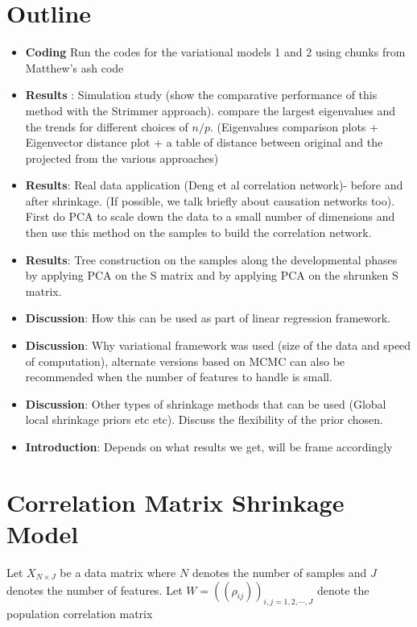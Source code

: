 \documentclass[12pt]{article}
\begin{document}
\section{Outline}

\begin{itemize}

\item \textbf{Coding} Run the codes for the variational models 1 and 2 using chunks from Matthew's ash code 
\item \textbf{Results} : Simulation study (show the comparative performance of this method with the Strimmer approach). compare the largest eigenvalues and the trends for different choices of $n/p$. (Eigenvalues comparison plots + Eigenvector distance plot + a table of distance between original and the projected from the various approaches)
\item \textbf{Results}: Real data application (Deng et al correlation network)- before and after shrinkage. (If possible, we talk briefly about causation networks too). First do PCA to scale down the data to a small number of dimensions and then use this method on the samples to build the correlation network.
\item \textbf{Results}: Tree construction on the samples along the developmental phases by applying PCA on the S matrix and by applying PCA on the shrunken S matrix. 
\item \textbf{Discussion}: How this can be used as part of linear regression framework.  
\item \textbf{Discussion}: Why variational framework was used (size of the data and speed of computation), alternate versions based on MCMC can also be recommended when the number of features to handle is small.
\item \textbf{Discussion}: Other types of shrinkage methods that can be used (Global local shrinkage priors etc etc). Discuss the flexibility of the prior chosen.
\item \textbf{Introduction}: Depends on what results we get, will be frame accordingly 

\end{itemize}



\section{Correlation Matrix Shrinkage Model}

Let $X_{N \times J}$ be a data matrix where $N$ denotes the number of samples and $J$ denotes the number of features. Let $W =  ((\rho_{ij}))_{i, j = 1,2, \cdots, J} $ denote  the population correlation matrix 
\end{document}
